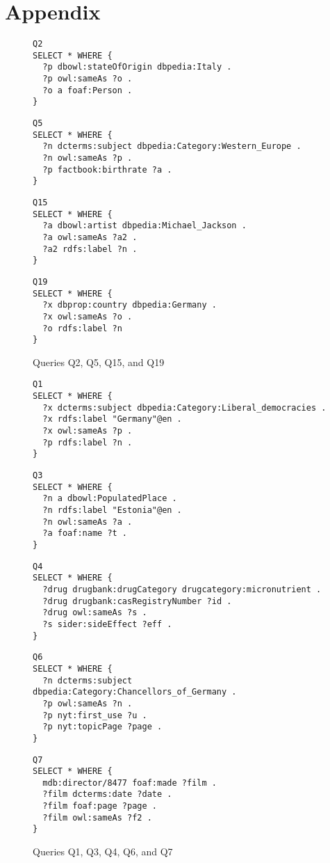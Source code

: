 
\section{Appendix}
\label{sec:app}
\begin{figure}[htb]
  \centering
\begin{verbatim}
Q2
SELECT * WHERE {
  ?p dbowl:stateOfOrigin dbpedia:Italy .
  ?p owl:sameAs ?o .
  ?o a foaf:Person .
}
\end{verbatim}
 
\begin{verbatim}
Q5
SELECT * WHERE {
  ?n dcterms:subject dbpedia:Category:Western_Europe .
  ?n owl:sameAs ?p .
  ?p factbook:birthrate ?a .
}
\end{verbatim}

\begin{verbatim}
Q15
SELECT * WHERE {
  ?a dbowl:artist dbpedia:Michael_Jackson .
  ?a owl:sameAs ?a2 .
  ?a2 rdfs:label ?n .
}
\end{verbatim}

\begin{verbatim}
Q19
SELECT * WHERE {
  ?x dbprop:country dbpedia:Germany .
  ?x owl:sameAs ?o .
  ?o rdfs:label ?n
}
\end{verbatim}

  \caption{Queries Q2, Q5, Q15, and Q19}
\label{fig:qtp3}
\end{figure}


\begin{figure}[htb]
  \centering
\begin{verbatim}
Q1
SELECT * WHERE {
  ?x dcterms:subject dbpedia:Category:Liberal_democracies .
  ?x rdfs:label "Germany"@en .
  ?x owl:sameAs ?p .
  ?p rdfs:label ?n .
}
\end{verbatim}
 
\begin{verbatim}
Q3
SELECT * WHERE {
  ?n a dbowl:PopulatedPlace .
  ?n rdfs:label "Estonia"@en .
  ?n owl:sameAs ?a .
  ?a foaf:name ?t .
}
\end{verbatim}

\begin{verbatim}
Q4
SELECT * WHERE {
  ?drug drugbank:drugCategory drugcategory:micronutrient .
  ?drug drugbank:casRegistryNumber ?id .
  ?drug owl:sameAs ?s .
  ?s sider:sideEffect ?eff .
}
\end{verbatim}

\begin{verbatim}
Q6
SELECT * WHERE {
  ?n dcterms:subject dbpedia:Category:Chancellors_of_Germany .
  ?p owl:sameAs ?n .
  ?p nyt:first_use ?u .
  ?p nyt:topicPage ?page .
}
\end{verbatim}

\begin{verbatim}
Q7
SELECT * WHERE {
  mdb:director/8477 foaf:made ?film .
  ?film dcterms:date ?date .
  ?film foaf:page ?page .
  ?film owl:sameAs ?f2 .
}
\end{verbatim}

  \caption{Queries Q1, Q3, Q4, Q6, and Q7}
\label{fig:qtp4}
\end{figure}

